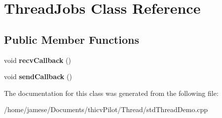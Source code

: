 \hypertarget{class_thread_jobs}{}\section{Thread\+Jobs Class Reference}
\label{class_thread_jobs}
\subsection*{Public Member Functions}
\begin{DoxyCompactItemize}
\item 
\mbox{\label{class_thread_jobs_a3c1192a2b2f898f1e5ef93a663b30ac2}} 
void {\bfseries recv\+Callback} ()
\item 
\mbox{\label{class_thread_jobs_ae2288d5e8462e5d70577b25998974bac}} 
void {\bfseries send\+Callback} ()
\end{DoxyCompactItemize}


The documentation for this class was generated from the following file\+:\begin{DoxyCompactItemize}
\item 
/home/jamese/\+Documents/thicv\+Pilot/\+Thread/std\+Thread\+Demo.\+cpp\end{DoxyCompactItemize}
